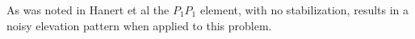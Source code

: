   As was noted in Hanert et al \cite{Hanert2002} the $P_1P_1$ element, with no
  stabilization, results in a noisy elevation pattern when applied to this
  problem. %
